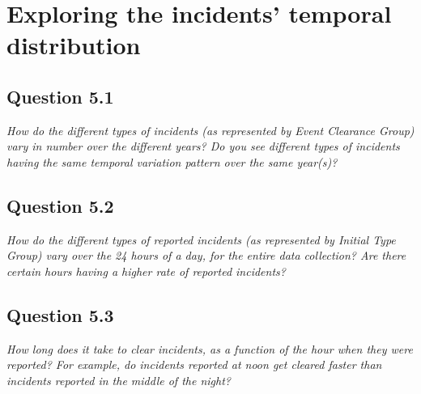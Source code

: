 \section{Exploring the incidents' temporal distribution}

\subsection*{Question 5.1}
\textit{How do the different types of incidents (as represented by Event Clearance Group) vary in number over the different years? Do you see different types of incidents having the same temporal variation pattern over the same year(s)?}


\subsection*{Question 5.2}
\textit{How do the different types of reported incidents (as represented by Initial Type Group) vary over the 24 hours of a day, for the entire data collection? Are there certain hours having a higher rate of reported incidents?}


\subsection*{Question 5.3}
\textit{How long does it take to clear incidents, as a function of the hour when they were reported? For example, do incidents reported at noon get cleared faster than incidents reported in the middle of the night?}
